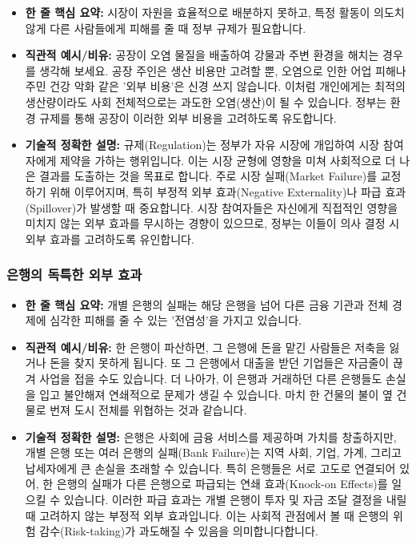 \documentclass[11pt,a4paper]{article}
\theoremstyle{definition}
\begin{document}
\begin{itemize}
    \item \textbf{한 줄 핵심 요약:} 시장이 자원을 효율적으로 배분하지 못하고, 특정 활동이 의도치 않게 다른 사람들에게 피해를 줄 때 정부 규제가 필요합니다.
    \item \textbf{직관적 예시/비유:} 공장이 오염 물질을 배출하여 강물과 주변 환경을 해치는 경우를 생각해 보세요. 공장 주인은 생산 비용만 고려할 뿐, 오염으로 인한 어업 피해나 주민 건강 악화 같은 '외부 비용'은 신경 쓰지 않습니다. 이처럼 개인에게는 최적의 생산량이라도 사회 전체적으로는 과도한 오염(생산)이 될 수 있습니다. 정부는 환경 규제를 통해 공장이 이러한 외부 비용을 고려하도록 유도합니다.
    \item \textbf{기술적 정확한 설명:} 규제(Regulation)는 정부가 자유 시장에 개입하여 시장 참여자에게 제약을 가하는 행위입니다. 이는 시장 균형에 영향을 미쳐 사회적으로 더 나은 결과를 도출하는 것을 목표로 합니다. 주로 시장 실패(Market Failure)를 교정하기 위해 이루어지며, 특히 부정적 외부 효과(Negative Externality)나 파급 효과(Spillover)가 발생할 때 중요합니다. 시장 참여자들은 자신에게 직접적인 영향을 미치지 않는 외부 효과를 무시하는 경향이 있으므로, 정부는 이들이 의사 결정 시 외부 효과를 고려하도록 유인합니다.
\end{itemize}

\subsubsection{은행의 독특한 외부 효과}

\begin{itemize}
    \item \textbf{한 줄 핵심 요약:} 개별 은행의 실패는 해당 은행을 넘어 다른 금융 기관과 전체 경제에 심각한 피해를 줄 수 있는 '전염성'을 가지고 있습니다.
    \item \textbf{직관적 예시/비유:} 한 은행이 파산하면, 그 은행에 돈을 맡긴 사람들은 저축을 잃거나 돈을 찾지 못하게 됩니다. 또 그 은행에서 대출을 받던 기업들은 자금줄이 끊겨 사업을 접을 수도 있습니다. 더 나아가, 이 은행과 거래하던 다른 은행들도 손실을 입고 불안해져 연쇄적으로 문제가 생길 수 있습니다. 마치 한 건물의 불이 옆 건물로 번져 도시 전체를 위협하는 것과 같습니다.
    \item \textbf{기술적 정확한 설명:} 은행은 사회에 금융 서비스를 제공하며 가치를 창출하지만, 개별 은행 또는 여러 은행의 실패(Bank Failure)는 지역 사회, 기업, 가계, 그리고 납세자에게 큰 손실을 초래할 수 있습니다. 특히 은행들은 서로 고도로 연결되어 있어, 한 은행의 실패가 다른 은행으로 파급되는 연쇄 효과(Knock-on Effects)를 일으킬 수 있습니다. 이러한 파급 효과는 개별 은행이 투자 및 자금 조달 결정을 내릴 때 고려하지 않는 부정적 외부 효과입니다. 이는 사회적 관점에서 볼 때 은행의 위험 감수(Risk-taking)가 과도해질 수 있음을 의미합니다합니다.
\end{itemize}
\end{document}
